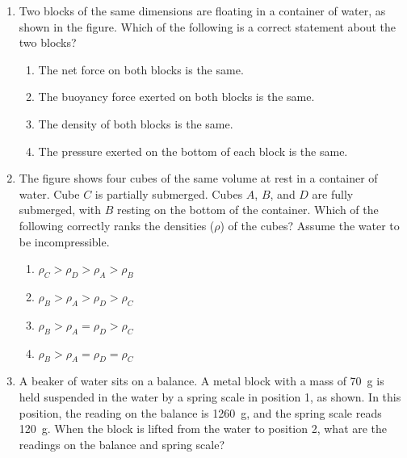 \documentclass{../../../oss-classkick}
\begin{document}
\begin{multicols}{2}
\begin{enumerate}[leftmargin=18pt,resume]
  \item Two blocks of the same dimensions are floating in a container of water,
    as shown in the figure. Which of the following is a correct statement about
    the two blocks?
    \begin{center}
      \vspace{-.15in}
    \end{center}
    \begin{enumerate}[nosep,leftmargin=18pt,label=(\Alph*)]
    \item The net force on both blocks is the same.
    \item The buoyancy force exerted on both blocks is the same.
    \item The density of both blocks is the same.
    \item The pressure exerted on the bottom of each block is the same.
    \end{enumerate}
    \vspace{.7in}
    
  \item The figure shows four cubes of the same volume at rest in a container
    of water. Cube $C$ is partially submerged. Cubes $A$, $B$, and $D$ are fully
    submerged, with $B$ resting on the bottom of the container. Which of the
    following correctly ranks the densities ($\rho$) of the cubes? Assume the
    water to be incompressible.
    \begin{center}
      \vspace{-.15in}
    \end{center}
    \begin{enumerate}[nosep,leftmargin=18pt,label=(\Alph*)]
    \item $\rho_C >\rho_D >\rho_A >\rho_B$
    \item $\rho_B >\rho_A >\rho_D >\rho_C$
    \item $\rho_B >\rho_A =\rho_D >\rho_C$
    \item $\rho_B >\rho_A =\rho_D =\rho_C$
    \end{enumerate}
    \columnbreak
    
  \item A beaker of water sits on a balance. A metal block with a mass of
    \SI{70}{\gram} is held suspended in the water by a spring scale in position
    1, as shown. In this position, the reading on the balance is
    \SI{1260}{\gram}, and the spring scale reads \SI{120}{\gram}. When the
    block is lifted from the water to position 2, what are the readings on the
    balance and spring scale?
    \begin{center}
      \vspace{-.15in}


\end{center}
\end{enumerate}
\end{multicols}
\end{document}
